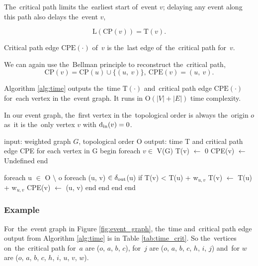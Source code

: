 The~critical path limits the~earliest start of~event $v$; delaying any event along this path also delays the~event $v$,

\begin{equation}
	\mathrm{L}(\mathrm{CP}(v)) = \mathrm{T}(v).
\end{equation}

\begin{definition}
Critical path edge $\mathrm{CPE}(\cdot)$ of~$v$ is the~last edge of~the~critical path for~$v$.
\end{definition}

We can again use the~Bellman principle to reconstruct the~critical path,
\begin{equation}
	\mathrm{CP}(v) = \mathrm{CP}(u) \cup \{(u,\ v)\},\ \mathrm{CPE}(v) = (u,\ v).
\end{equation}

Algorithm \ref{alg:time} outputs the~time $\mathrm{T}(\cdot)$ and~critical path edge $\mathrm{CPE}(\cdot)$ for~each vertex in the~event graph. It runs in $\mathrm{O}(|V| + |E|)$ time complexity.

\begin{remark}
In our event graph, the~first vertex in the~topological order is always the~origin $o$ as~it is the~only vertex $v$ with $\operatorname{d_{in}}(v) = 0$.
\end{remark}

\begin{algorithm}[float, caption={Time and~critical path predecessor calculation}, label={alg:time}]
input: weighted graph $G$, topological order O
output: time T and critical path edge CPE for each vertex in G
begin
  foreach $v \in$ V(G)
    T(v) $\gets$ 0
    CPE(v) $\gets$ Undefined
  end

  foreach u $\in$ O $\setminus$ {o}
    foreach (u, v) $\in \operatorname{\delta_{out}}$(u)
      if T(v) < T(u) + w$_{u,v}$
        T(v) $\gets$ T(u) + w$_{u,v}$
        CPE(v) $\gets$ (u, v)
      end
    end
  end
end
\end{algorithm}

\subsubsection{Example}
For~the~event graph in Figure \ref{fig:event_graph}, the~time and~critical path edge output from Algorithm \ref{alg:time} is in Table \ref{tab:time_crit}. So the~vertices on~the~critical path for~$a$ are ($o$, $a$, $b$, $c$), for~$j$ are ($o$, $a$, $b$, $c$, $h$, $i$, $j$) and~for $w$ are ($o$, $a$, $b$, $c$, $h$, $i$, $u$, $v$, $w$).

